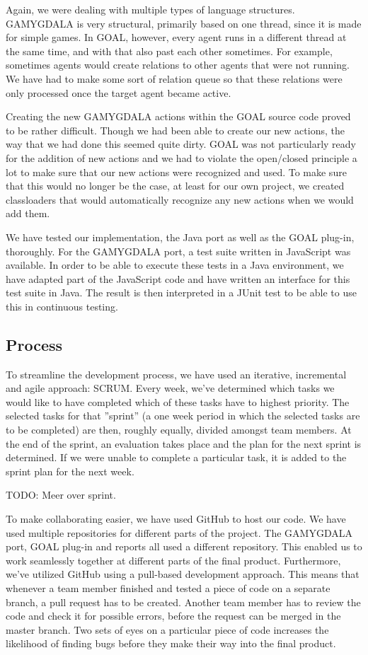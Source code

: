 Again, we were dealing with multiple types of language structures. GAMYGDALA is very structural, primarily based on one thread, since it is made for simple games. In GOAL, however, every agent runs in a different thread at the same time, and with that also past each other sometimes. For example, sometimes agents would create relations to other agents that were not running. We have had to make some sort of relation queue so that these relations were only processed once the target agent became active.

Creating the new GAMYGDALA actions within the GOAL source code proved to be rather difficult. Though we had been able to create our new actions, the way that we had done this seemed quite dirty. GOAL was not particularly ready for the addition of new actions and we had to violate the open/closed principle a lot to make sure that our new actions were recognized and used. To make sure that this would no longer be the case, at least for our own project, we created classloaders that would automatically recognize any new actions when we would add them.

We have tested our implementation, the Java port as well as the GOAL plug-in, thoroughly. For the GAMYGDALA port, a test suite written in JavaScript was available. In order to be able to execute these tests in a Java environment, we have adapted part of the JavaScript code and have written an interface for this test suite in Java. The result is then interpreted in a JUnit test to be able to use this in continuous testing.

\subsection{Process}
To streamline the development process, we have used an iterative, incremental and agile approach: SCRUM. Every week, we've determined which tasks we would like to have completed which of these tasks have to highest priority. The selected tasks for that ''sprint'' (a one week period in which the selected tasks are to be completed) are then, roughly equally, divided amongst team members. At the end of the sprint, an evaluation takes place and the plan for the next sprint is determined. If we were unable to complete a particular task, it is added to the sprint plan for the next week.

TODO: Meer over sprint.

To make collaborating easier, we have used GitHub to host our code. We have used multiple repositories for different parts of the project. The GAMYGDALA port, GOAL plug-in and reports all used a different repository. This enabled us to work seamlessly together at different parts of the final product. Furthermore, we've utilized GitHub using a pull-based development approach. This means that whenever a team member finished and tested a piece of code on a separate branch, a pull request has to be created. Another team member has to review the code and check it for possible errors, before the request can be merged in the master branch. Two sets of eyes on a particular piece of code increases the likelihood of finding bugs before they make their way into the final product. 

